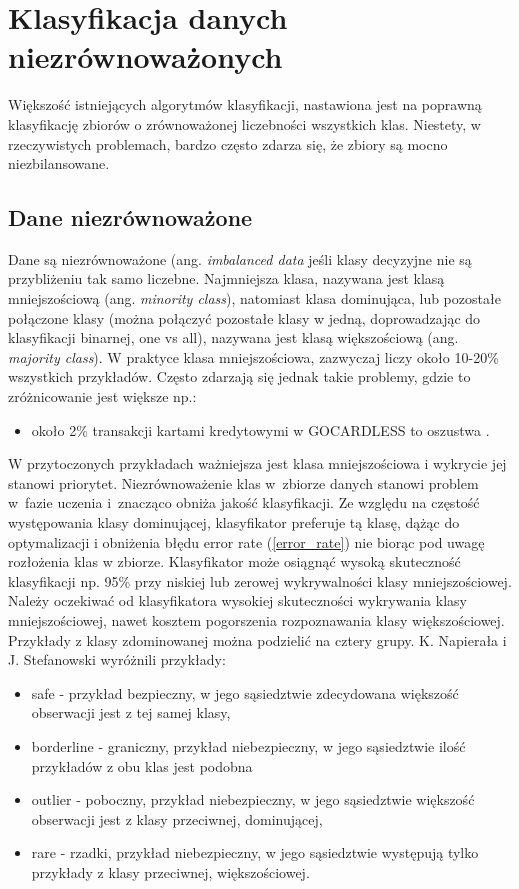 \chapter{Klasyfikacja danych niezrównoważonych}

Większość istniejących algorytmów klasyfikacji, nastawiona jest na poprawną klasyfikację zbiorów o zrównoważonej liczebności wszystkich klas. Niestety, w rzeczywistych problemach, bardzo często zdarza się, że zbiory są mocno niezbilansowane.
\section{Dane niezrównoważone}
Dane są niezrównoważone (ang. \textit{imbalanced data} jeśli klasy decyzyjne nie są przybliżeniu tak samo liczebne. Najmniejsza klasa, nazywana jest klasą mniejszościową (ang. \textit{minority class}), natomiast klasa dominująca, lub pozostałe połączone klasy (można połączyć pozostałe klasy w jedną, doprowadzając do klasyfikacji binarnej, one vs all), nazywana jest klasą większościową (ang. \textit{majority class}). W praktyce klasa mniejszościowa, zazwyczaj liczy około 10-20\% wszystkich przykładów. Często zdarzają się jednak takie problemy, gdzie to zróżnicowanie jest większe np.:
\begin{itemize}
	\item około 2\% transakcji kartami kredytowymi w GOCARDLESS to oszustwa \cite{gocardless}.
	
\end{itemize}
W przytoczonych przykładach ważniejsza jest klasa mniejszościowa i wykrycie jej stanowi priorytet. Niezrównoważenie klas w zbiorze danych stanowi problem w fazie uczenia i znacząco obniża jakość klasyfikacji. Ze względu na częstość występowania klasy dominującej, klasyfikator preferuje tą klasę, dążąc do optymalizacji i obniżenia błędu error rate (\ref{error_rate}) nie biorąc pod uwagę rozłożenia klas w zbiorze. Klasyfikator może osiągnąć wysoką skuteczność klasyfikacji np. 95\% przy niskiej lub zerowej wykrywalności klasy mniejszościowej. 
Należy oczekiwać od klasyfikatora wysokiej skuteczności wykrywania klasy mniejszościowej, nawet kosztem pogorszenia rozpoznawania klasy większościowej.
Przykłady z klasy zdominowanej można podzielić na cztery grupy. K. Napierała i J. Stefanowski wyróżnili przykłady\cite{przykladyklas}:
\begin{itemize}
	\item safe - przykład bezpieczny, w jego sąsiedztwie zdecydowana większość obserwacji jest z tej samej klasy,
	\item borderline - graniczny, przykład niebezpieczny, w jego sąsiedztwie ilość przykładów z obu klas jest podobna
	\item outlier - poboczny, przykład niebezpieczny, w jego sąsiedztwie większość obserwacji jest z klasy przeciwnej, dominującej,
	\item rare - rzadki, przykład niebezpieczny, w jego sąsiedztwie występują tylko przykłady z klasy przeciwnej, większościowej.
\end{itemize}
